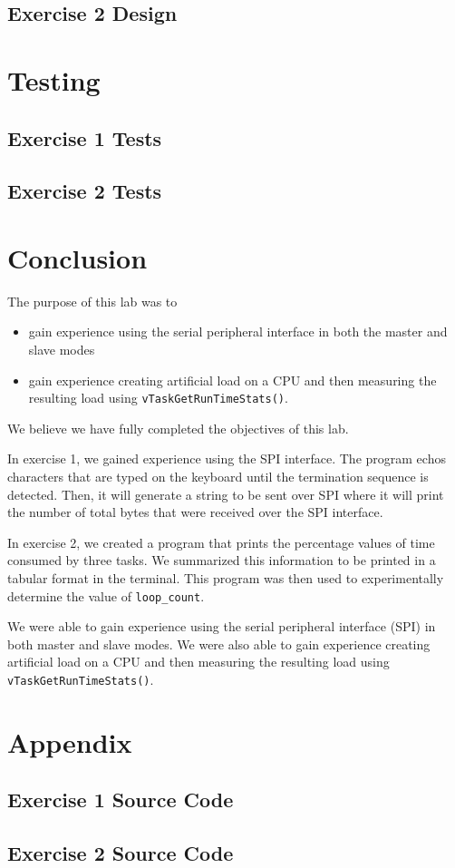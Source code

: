\documentclass[11pt, letterpaper, titlepage]{article}
\begin{document}
\inputminted[]{text}{E1_output.txt}

\subsection{Exercise 2 Design}


\section{Testing}

\subsection{Exercise 1 Tests}

\subsection{Exercise 2 Tests}

\section{Conclusion}
The purpose of this lab was to 
\begin{itemize}
  \item gain experience using the serial peripheral interface in both the master and slave modes
  \item gain experience creating artificial load on a CPU and then measuring the resulting load using \texttt{vTaskGetRunTimeStats()}.
\end{itemize}

We believe we have fully completed the objectives of this lab.

In exercise 1, we gained experience using the SPI interface. The program echos characters that are typed on the keyboard until the termination sequence is detected. Then, it will generate a string to be sent over SPI where it will print the number of total bytes that were received over the SPI interface.

In exercise 2, we created a program that prints the percentage values of time consumed by three tasks. We summarized this information to be printed in a tabular format in the terminal. This program was then used to experimentally determine the value of \texttt{loop_count}.

We were able to gain experience using the serial peripheral interface (SPI) in both master and slave modes. We were also able to gain experience creating artificial load on a CPU and then measuring the resulting load using \texttt{vTaskGetRunTimeStats()}.

\section{Appendix}

\subsection{Exercise 1 Source Code}

\subsection{Exercise 2 Source Code}
\end{document}
